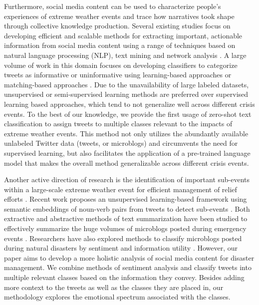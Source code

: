 \documentclass{article}
\begin{document}
Furthermore, social media content can be used to characterize people's experiences of extreme
weather events and trace how narratives took shape through collective knowledge production. Several
existing studies focus on developing efficient and scalable methods for extracting important,
actionable information from social media content using a range of techniques based on natural
language processing (NLP), text mining and network analysis \cite{Imran2013,Imran2013a,Imran2014}. A
large volume of work in this domain focuses on developing classifiers to categorize tweets as
informative or uninformative using learning-based approaches
\cite{Alam2018,Hernandez-Suarez2019,Zhang2016} or matching-based approaches \cite{To2017,Mehra2017}.
Due to the unavailability of large labeled datasets, unsupervised or semi-supervised learning
methods \cite{Alam2018,Zhang2016,Arachie2020} are preferred over supervised learning based
approaches, which tend to not generalize well across different crisis events. To the best of our
knowledge, we provide the first usage of zero-shot text classification to assign tweets to multiple
classes relevant to the impacts of extreme weather events. This method not only utilizes the
abundantly available unlabeled Twitter data (tweets, or microblogs) and circumvents the need for
supervised learning, but also facilitates the application of a pre-trained language model that makes
the overall method generalizable across different crisis events. 

Another active direction of research is the identification of important sub-events within a
large-scale extreme weather event for efficient management of relief efforts \cite{Rudra2018}.
Recent work proposes an unsupervised learning-based framework using semantic embeddings of noun-verb
pairs from tweets to detect sub-events \cite{Arachie2020}. Both extractive and abstractive methods
of text summarization have been studied to effectively summarize the huge volumes of microblogs
posted during emergency events \cite{Rudra2015,Rudra2016,Mehra2017,Dutta2018}. Researchers have also
explored methods to classify microblogs posted during natural disasters by sentiment and information
utility \cite{Ragini2018,Zhang2016}. However, our paper aims to develop a more holistic analysis of
social media content for disaster management. We combine methods of sentiment analysis and classify
tweets into multiple relevant classes based on the information they convey. Besides adding more
context to the tweets as well as the classes they are placed in, our methodology explores the
emotional spectrum associated with the classes. 
\end{document}
